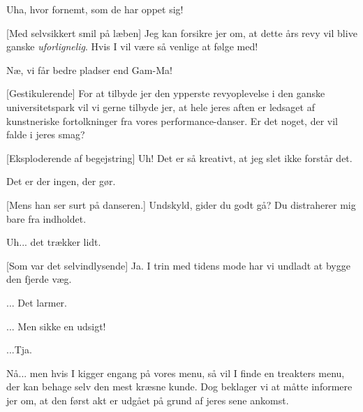 \documentclass[a4paper,11pt]{article}
\begin{document}
\begin{sketch}

 Uha, hvor fornemt, som de har oppet sig!

[Med selvsikkert smil på læben] Jeg kan forsikre jer om, at dette års revy vil blive ganske \emph{uforlignelig}. Hvis I vil være så venlige at følge med!


 Næ, vi får bedre pladser end Gam-Ma!


[Gestikulerende] For at tilbyde jer den ypperste revyoplevelse i den ganske universitetspark vil vi gerne tilbyde jer, at hele jeres aften er ledsaget af kunstneriske fortolkninger fra vores performance-danser. Er det noget, der vil falde i jeres smag?

[Eksploderende af begejstring] Uh! Det er så kreativt, at jeg slet ikke forstår det.


 Det er der ingen, der gør.

[Mens han ser surt på danseren.] Undskyld, gider du godt gå? Du distraherer mig bare fra indholdet.


 Uh... det trækker lidt.

[Som var det selvindlysende] Ja. I trin med tidens mode har vi undladt at bygge den fjerde væg.


 ... Det larmer.


 ... Men sikke en udsigt!


 ...Tja.

 Nå... men hvis I kigger engang på vores menu, så vil I finde en treakters menu, der kan behage selv den mest kræsne kunde. Dog beklager vi at måtte informere jer om, at den først akt er udgået på grund af jeres sene ankomst.


\end{sketch}
\end{document}
